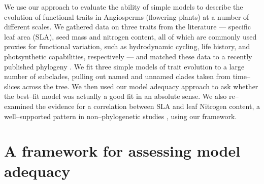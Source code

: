 \documentclass[a4paper,12pt]{article}
\begin{document}
We use our approach to evaluate the ability of simple models to describe the evolution of functional traits in Angiosperms (flowering plants) at a number of different scales. We gathered data on three traits from the literature --- specific leaf area (SLA), seed mass and nitrogen content, all of which are commonly used proxies for functional variation, such as hydrodynamic cycling, life history, and photsynthetic capabilities, respectively \citep{Westoby2002} --- and matched these data to a recently published phylogeny \citep{Zanne2013}. We fit three simple models of trait evolution \citep[BM, OU, and EB, after][]{Harmon2010} to a large number of subclades, pulling out named and unnamed clades taken from time--slices across the tree. We then used our model adequacy approach to ask whether the best--fit model was actually a good fit in an absolute sense. We also re--examined the evidence for a correlation between SLA and leaf Nitrogen content, a well--supported pattern in non--phylogenetic studies \citep[e.g.][]{Wright2004}, using our framework.



\section*{A framework for assessing model adequacy}
\end{document}
